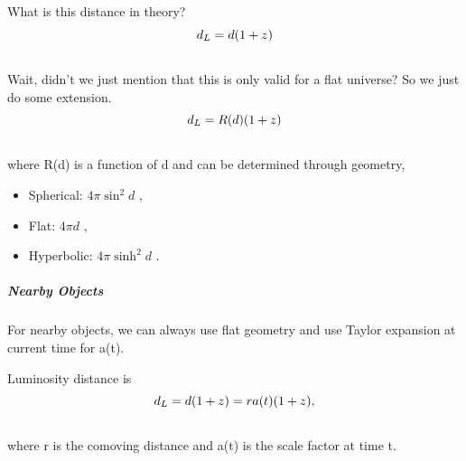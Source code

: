 \documentclass[letterpaper,10pt,english]{sphinxmanual}
\begin{document}
{What is this distance in theory?
\begin{gather}
\begin{split}d_L = d (1+z)\end{split}\notag\\\begin{split}\end{split}\notag
\end{gather}
Wait, didn't we just mention that this is only valid for a flat universe? So we just do some extension.
\begin{gather}
\begin{split}d_L = R(d) (1+z)\end{split}\notag\\\begin{split}\end{split}\notag
\end{gather}
where R(d) is a function of d and can be determined through geometry,
\begin{itemize}
\item {} 
Spherical: $4\pi \sin^2 d$ ,

\item {} 
Flat: $4\pi d$ ,

\item {} 
Hyperbolic: $4\pi \sinh^2 d$ .

\end{itemize}


\subparagraph{Nearby Objects}
\label{Cosmology/cosmoIndex:nearby-objects}
For nearby objects, we can always use flat geometry and use Taylor expansion at current time for a(t).

Luminosity distance is
\begin{gather}
\begin{split}d_L = d (1+z) = r a(t) (1+z) ,\end{split}\notag\\\begin{split}\end{split}\notag
\end{gather}
where r is the comoving distance and a(t) is the scale factor at time t.

}
\end{document}
